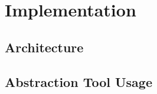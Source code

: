 \chapter{Implementation}
\label{sec:impl}

\section{Architecture}

\section{Abstraction Tool Usage}

